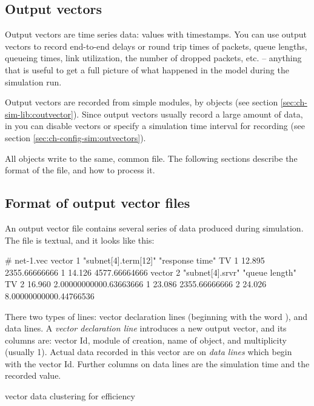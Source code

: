\subsection{Output vectors}
\label{sec:ch-ana-sim:output-vectors}

Output vectors are time series data: values with timestamps.
You can use output vectors to record end-to-end delays or
round trip times of packets, queue lengths, queueing times,
link utilization, the number of dropped packets, etc. --
anything that is useful to get a full picture of what happened
in the model during the simulation run.

Output vectors are recorded from simple modules, by  objects
(see section \ref{sec:ch-sim-lib:coutvector}). Since output vectors usually
record a large amount of data, in  you can disable vectors
or specify a simulation time interval for recording
(see section \ref{sec:ch-config-sim:outvectors}).

All  objects write to the same, common file.
The following sections describe the format of the file, and
how to process it.


\subsection{Format of output vector files}

An output vector file contains several
series of data produced during simulation. The file is textual, and it
looks like this:

\begin{filelisting}
# net-1.vec
vector 1   "subnet[4].term[12]"  "response time"  TV
1  12.895  2355.66666666
1  14.126  4577.66664666
vector 2   "subnet[4].srvr"  "queue length"  TV
2  16.960  2.00000000000.63663666
1  23.086  2355.66666666
2  24.026  8.00000000000.44766536
\end{filelisting}

There two types of lines: vector declaration lines (beginning with
the word ), and data lines.
A \textit{vector declaration line} introduces a new output vector, and
its columns are: vector Id, module of creation, name of 
object, and multiplicity (usually 1). Actual data recorded in this
vector are on \textit{data lines} which begin with the vector Id.
Further columns on data lines are the simulation time and the recorded value.

vector data clustering for efficiency


